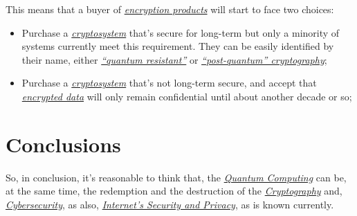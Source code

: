 \documentclass[conference]{IEEEtran}
\begin{document}
This means that a buyer of \href{https://en.wikipedia.org/wiki/Encryption_software}{\textit{encryption products}} will start to face two choices:

\begin{itemize}
    \item Purchase a \href{https://en.wikipedia.org/wiki/Cryptosystem}{\textit{cryptosystem}} that's secure for long-term but only a minority of systems currently meet this requirement. They can be easily identified by their name, either \href{https://en.wikipedia.org/wiki/Post-quantum_cryptography}{\textit{“quantum resistant”}} or \href{https://en.wikipedia.org/wiki/Post-quantum_cryptography}{\textit{“post-quantum” cryptography}};
    \item  Purchase a \href{https://en.wikipedia.org/wiki/Cryptosystem}{\textit{cryptosystem}} that's not long-term secure, and accept that \href{https://en.wikipedia.org/wiki/Encryption}{\textit{encrypted data}} will only remain confidential until about another decade or so;
\end{itemize}

\vspace{6pt}

\section*{Conclusions}

So, in conclusion, it's reasonable to think that, the \href{https://en.wikipedia.org/wiki/Quantum_computing}{\textit{Quantum Computing}} can be, at the same time, the redemption and the destruction of the \href{https://en.wikipedia.org/wiki/Cryptography}{\textit{Cryptography}}  and, \href{https://en.wikipedia.org/wiki/Computer_security}{\textit{Cybersecurity}}, as also, \href{https://en.wikipedia.org/wiki/Computer_security}{\textit{Internet's Security and Privacy}}, as is known currently.

\vspace{6pt}
\end{document}
